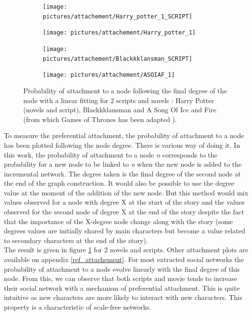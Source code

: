 \documentclass[a4paper, 12pt]{report}
\begin{document}
\begin{figure}
\begin{subfigure}{.49\textwidth}
\centering
\texttt{[image: pictures/attachement/Harry\_potter\_1\_SCRIPT]}
\end{subfigure}
\hfill
\begin{subfigure}{.49\textwidth}
\centering
\texttt{[image: pictures/attachement/Harry\_potter\_1]}
\end{subfigure}
\hfill
\begin{subfigure}{.49\textwidth}
\centering
\texttt{[image: pictures/attachement/Blackkklansman\_SCRIPT]}
\end{subfigure}
\hfill
\begin{subfigure}{.49\textwidth}
\texttt{[image: pictures/attachement/ASOIAF\_1]}
\end{subfigure}
\caption{Probability of attachment to a node following the final degree of the node with a linear fitting for 2 scripts and novels : Harry Potter (novels and script), Blackkklansman and A Song Of Ice and Fire (from which Games of Thrones has been adapted
).}
\label{attachement}
\end{figure}

To measure the preferential attachment, the probability of attachment to a node has been plotted following the node degree. There is various way of doing it. In this work, the probability of attachment to a node \textit{n} corresponds to the probability for a new node to be linked to \textit{n} when the new node is added to the incremental network. The degree taken is the final degree of the second node at the end of the graph construction. It would also be possible to use the degree value at the moment of the addition of the new node. But this method would mix values observed for a node with degree X at the start of the story and the values observed for the second node of degree X at the end of the story despite the fact that the importance of the X-degree node change along with the story (some degrees values are initially shared by main characters but become a value related to secondary characters at the end of the story). \\

The result is given in figure \ref{attachement} for 2 novels and scripts. Other attachment plots are available on appendix \ref{ref_attachement}. For most extracted social networks the probability of attachment to a node evolve linearly with the final degree of this node. From this, we can observe that both scripts and movie tends to increase their social network with a mechanism of preferential attachment. This is quite intuitive as new characters are more likely to interact with new characters. This property is a characteristic of scale-free networks.
\end{document}
